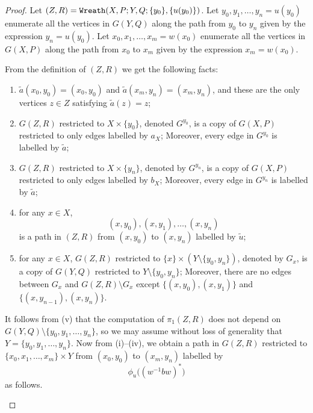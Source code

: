 \documentclass[11pt]{amsart}
\theoremstyle{definition}
\theoremstyle{definition}
\numberwithin{equation}{section}
\begin{document}
\begin{proof} Let $(Z, R)=\mbox{\tt Wreath}(X,P; Y, Q; \{y_0\}, \{u(y_0)\})$. Let $y_0, y_1, \dots, y_n=u(y_0)$ enumerate all the vertices in $G(Y, Q)$ along the path from $y_0$ to $y_n$ given by the expression $y_n=u(y_0)$. Let $x_0, x_1, \dots, x_m=w(x_0)$ enumerate all the vertices in $G(X, P)$ along the path from $x_0$ to $x_m$ given by the expression $x_m=w(x_0)$. 

From the definition of $(Z, R)$ we get the following facts:
\begin{enumerate}
\item[(i)] $\tilde{a}(x_0, y_0)=(x_0, y_0)$ and $\tilde{a}(x_m, y_n)=(x_m, y_n)$, and these are the only vertices $z\in Z$ satisfying $\tilde{a}(z)=z$;
\item[(ii)] $G(Z, R)$ restricted to $X\times \{y_0\}$, denoted $G^{y_0}$, is a copy of $G(X, P)$ restricted to only edges labelled by $a_X$; Moreover, every edge in $G^{y_0}$ is labelled by $\tilde{a}$;
\item[(iii)] $G(Z, R)$ restricted to $X\times \{y_n\}$, denoted by $G^{y_n}$, is a copy of $G(X, P)$ restricted to only edges labelled by $b_X$; Moreover, every edge in $G^{y_n}$ is labelled by $\tilde{a}$;
\item[(iv)] for any $x\in X$, 
$$ (x, y_0), (x, y_1), \dots, (x, y_n) $$
is a path in $(Z, R)$ from $(x, y_0)$ to $(x, y_n)$ labelled by $\tilde{u}$;
\item[(v)] for any $x\in X$, $G(Z, R)$ restricted to $\{x\}\times (Y\setminus\{y_0, y_n\})$, denoted by $G_x$, is a copy of $G(Y, Q)$ restricted to $Y\setminus \{y_0, y_n\}$; Moreover, there are no edges between $G_x$ and $G(Z, R)\setminus G_x$ except $\{(x, y_0), (x, y_1)\}$ and $\{(x, y_{n-1}), (x, y_n)\}$.
\end{enumerate}
It follows from (v) that the computation of $\pi_1(Z, R)$ does not depend on $G(Y, Q)\setminus\{y_0, y_1, \dots, y_n\}$, so we may assume without loss of generality that $Y=\{y_0, y_1, \dots, y_n\}$. Now from (i)--(iv), we obtain a path in $G(Z, R)$ restricted to $\{x_0, x_1,\dots, x_m\}\times Y$ from $(x_0, y_0)$ to $(x_m, y_n)$ labelled by 
$$\phi_u\big((w^{-1}bw)^*\big)$$ as follows.

\begin{figure}[htbp]
\centering
{}
\end{figure}
\end{proof}
\end{document}
